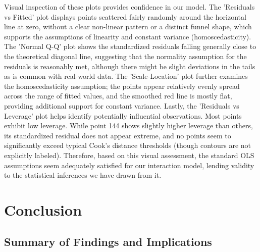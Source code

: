 \documentclass[11pt, a4paper]{article} %
\begin{document}
Visual inspection of these plots provides confidence in our model. The 'Residuals vs Fitted' plot displays points scattered fairly randomly around the horizontal line at zero, without a clear non-linear pattern or a distinct funnel shape, which supports the assumptions of linearity and constant variance (homoscedasticity). The 'Normal Q-Q' plot shows the standardized residuals falling generally close to the theoretical diagonal line, suggesting that the normality assumption for the residuals is reasonably met, although there might be slight deviations in the tails as is common with real-world data. The 'Scale-Location' plot further examines the homoscedasticity assumption; the points appear relatively evenly spread across the range of fitted values, and the smoothed red line is mostly flat, providing additional support for constant variance. Lastly, the 'Residuals vs Leverage' plot helps identify potentially influential observations. Most points exhibit low leverage. While point 144 shows slightly higher leverage than others, its standardized residual does not appear extreme, and no points seem to significantly exceed typical Cook's distance thresholds (though contours are not explicitly labeled). Therefore, based on this visual assessment, the standard OLS assumptions seem adequately satisfied for our interaction model, lending validity to the statistical inferences we have drawn from it.




\section{Conclusion} %

\subsection{Summary of Findings and Implications} %
\end{document}
